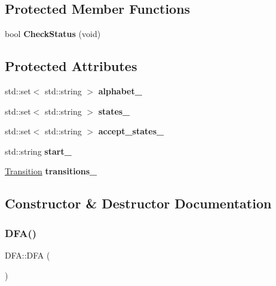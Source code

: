 \subsection*{Protected Member Functions}
\begin{DoxyCompactItemize}
\item 
\mbox{\label{classDFA_aa9795210cfe2d3d52340156a2aad821a}} 
bool {\bfseries Check\+Status} (void)
\end{DoxyCompactItemize}
\subsection*{Protected Attributes}
\begin{DoxyCompactItemize}
\item 
\mbox{\label{classDFA_a711a4a12e02863a5c77276cec9c26adf}} 
std\+::set$<$ std\+::string $>$ {\bfseries alphabet\+\_\+}
\item 
\mbox{\label{classDFA_a342859c374fc55b4b6840bc9ceb509e6}} 
std\+::set$<$ std\+::string $>$ {\bfseries states\+\_\+}
\item 
\mbox{\label{classDFA_acd539384c98d48d82f9ea4d91d28d39c}} 
std\+::set$<$ std\+::string $>$ {\bfseries accept\+\_\+states\+\_\+}
\item 
\mbox{\label{classDFA_afbc55e921d6aeb30357ed8be17cfe1e0}} 
std\+::string {\bfseries start\+\_\+}
\item 
\mbox{\label{classDFA_a467379e924d9b124f71e1233a4294936}} 
\hyperlink{classTransition}{Transition} {\bfseries transitions\+\_\+}
\end{DoxyCompactItemize}


\subsection{Constructor \& Destructor Documentation}
\mbox{\label{classDFA_a0739bd751a325dd162604ed63fadea69}} 
\subsubsection{\texorpdfstring{D\+F\+A()}{DFA()}\hspace{0.1cm}{\footnotesize\ttfamily [1/2]}}
{\footnotesize\ttfamily D\+F\+A\+::\+D\+FA (\begin{DoxyParamCaption}{ }\end{DoxyParamCaption})}

